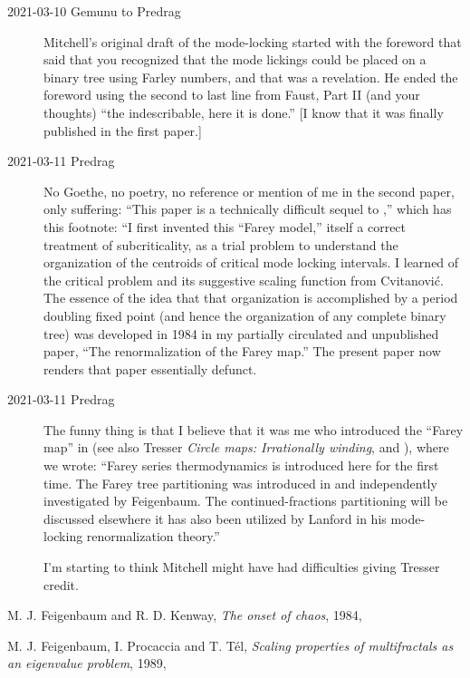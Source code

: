 \begin{description}
  \item[2021-03-10 Gemunu to Predrag]
Mitchell's original draft of the mode-locking started with the foreword
that said that you recognized that the mode lickings could be placed on a
binary tree using Farley numbers, and that was a revelation. He ended the
foreword using the second to last line from Faust, Part II (and your
thoughts) ``the indescribable, here it is done.'' [I know that it was
finally published in the first paper.]
  \item[2021-03-11 Predrag]
No Goethe, no poetry, no reference or mention of me in the second
paper, only suffering: ``This paper is a technically
difficult sequel to ,'' which has this footnote: ``I
first invented this ``Farey model,'' itself a correct treatment of
subcriticality, as a trial problem to understand the organization of the
centroids of critical mode locking intervals. I learned of the critical
problem and its suggestive scaling function from Cvitanovi\'c. The essence
of the idea that that organization is accomplished by a period doubling
fixed point (and hence the organization of any complete binary tree) was
developed in 1984 in my partially circulated and unpublished paper, ``The
renormalization of the Farey map.'' The present paper now renders that
paper essentially defunct.
  \item[2021-03-11 Predrag]
The funny thing is that I believe that it was me who introduced
the ``Farey map'' in  (see also
Tresser {\em Circle maps: {Irrationally} winding}, and
), where we wrote:
``Farey series thermodynamics is introduced here for the first time. The
Farey tree partitioning was introduced in  and
independently investigated by Feigenbaum. The
continued-fractions partitioning will be discussed elsewhere it
has also been utilized by Lanford in his mode-locking renormalization
theory.''

I'm starting to think Mitchell might have had difficulties giving Tresser
credit.
\end{description}

{M. J. Feigenbaum and R. D. Kenway},
{\em The onset of chaos},
{1984},

{M. J. Feigenbaum, I. Procaccia and T. T{\'e}l},
  {\em Scaling properties of multifractals as an eigenvalue problem},
{1989},

